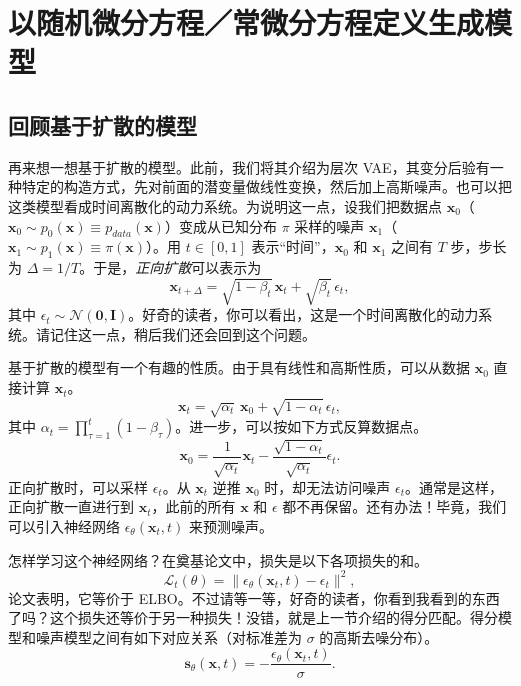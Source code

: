 \section[用随机／常微分方程定义生成模型]{以随机微分方程／常微分方程定义生成模型}
\label{sec:09-03}

\subsection{回顾基于扩散的模型}

再来想一想基于扩散的模型。此前，我们将其介绍为层次 VAE，其变分后验有一种特定的构造方式，先对前面的潜变量做线性变换，然后加上高斯噪声。也可以把这类模型看成时间离散化的动力系统。为说明这一点，设我们把数据点 $\mathbf x_0$（$\mathbf x_0\sim p_0(\mathbf x)\equiv p_{\mathit{data}}(\mathbf x)$）变成从已知分布 $\pi$ 采样的噪声 $\mathbf x_1$（$\mathbf x_1\sim p_1(\mathbf x)\equiv\pi(\mathbf x)$）。用 $t\in[0,1]$ 表示“时间”，$\mathbf x_0$ 和 $\mathbf x_1$ 之间有 $T$ 步，步长为 $\Delta=1/T$。于是，\emph{正向扩散}可以表示为
\begin{equation}
  \mathbf x_{t+\Delta}=\sqrt{1-\beta_t}\,\mathbf x_t+\sqrt{\beta_t}\,\epsilon_t,
  \tag{9.15}\label{eq:09-15}
\end{equation}
其中 $\epsilon_t\sim\mathcal N(\mathbf 0,\mathbf I)$。好奇的读者，你可以看出，这是一个时间离散化的动力系统。请记住这一点，稍后我们还会回到这个问题。

基于扩散的模型有一个有趣的性质。由于具有线性和高斯性质，可以从数据 $\mathbf x_0$ 直接计算 $\mathbf x_t$。
\begin{equation}
  \mathbf x_t=\sqrt{\alpha_t}\,\mathbf x_0+\sqrt{1-\alpha_t}\,\epsilon_t,
  \tag{9.16}\label{eq:09-16}
\end{equation}
其中 $\alpha_t=\prod_{\tau=1}^{t}(1-\beta_\tau)$。进一步，可以按如下方式反算数据点。
\begin{equation}
  \mathbf x_0=\frac{1}{\sqrt{\alpha_t}}\mathbf x_t-
    \frac{\sqrt{1-\alpha_t}}{\sqrt{\alpha_t}}\epsilon_t.
  \tag{9.17}\label{eq:09-17}
\end{equation}
正向扩散时，可以采样 $\epsilon_t$。从 $\mathbf x_t$ 逆推 $\mathbf x_0$ 时，却无法访问噪声 $\epsilon_t$。通常是这样，正向扩散一直进行到 $\mathbf x_t$，此前的所有 $\mathbf x$ 和 $\epsilon$ 都不再保留。还有办法！毕竟，我们可以引入神经网络 $\epsilon_\theta(\mathbf x_t,t)$ 来预测噪声。

怎样学习这个神经网络？在奠基论文中，损失是以下各项损失的和。
\begin{equation}
  \mathcal L_t(\theta)=\lVert\epsilon_\theta(\mathbf x_t,t)-\epsilon_t\rVert^2,
  \tag{9.18}\label{eq:09-18}
\end{equation}
论文表明，它等价于 ELBO。不过请等一等，好奇的读者，你看到我看到的东西了吗？这个损失还等价于另一种损失！没错，就是上一节介绍的得分匹配。得分模型和噪声模型之间有如下对应关系（对标准差为 $\sigma$ 的高斯去噪分布）。
\begin{equation}
  \mathbf s_\theta(\mathbf x,t)=-\frac{\epsilon_\theta(\mathbf x_t,t)}{\sigma}.
  \tag{9.19}\label{eq:09-19}
\end{equation}


